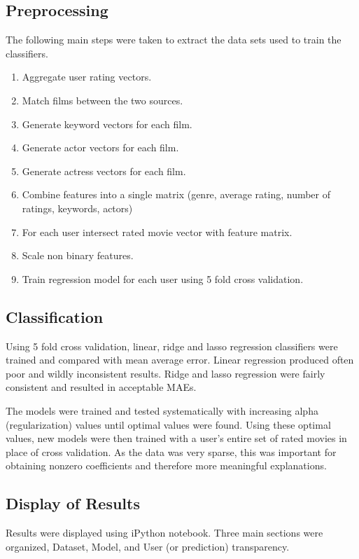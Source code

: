 \documentclass[letterpaper, 10 pt, conference]{ieeeconf}  %
\begin{document}
\subsection{Preprocessing}
The following main steps were taken to extract the data sets used to train the classifiers.
\begin{enumerate}
  \item Aggregate user rating vectors.
  \item Match films between the two sources.
  \item Generate keyword vectors for each film.
  \item Generate actor vectors for each film.
  \item Generate actress vectors for each film.
  \item Combine features into a single matrix (genre, average rating, number of ratings, keywords, actors)
  \item For each user intersect rated movie vector with feature matrix.
  \item Scale non binary features.
  \item Train regression model for each user using 5 fold cross validation.
\end{enumerate}

\subsection{Classification}
Using 5 fold cross validation, linear, ridge and lasso regression classifiers were trained and compared with mean average error. Linear regression produced often poor and wildly inconsistent results. Ridge and lasso regression were fairly consistent and resulted in acceptable MAEs.

The models were trained and tested systematically with increasing alpha (regularization) values until optimal values were found. Using these optimal values, new models were then trained with a user's entire set of rated movies in place of cross validation. As the data was very sparse, this was important for obtaining nonzero coefficients and therefore more meaningful explanations.

\subsection{Display of Results}
Results were displayed using iPython notebook. Three main sections were organized, Dataset, Model, and User (or prediction) transparency.
\end{document}

